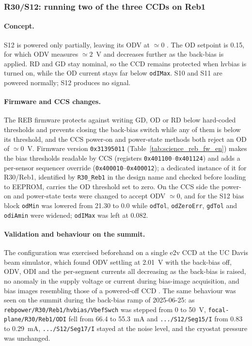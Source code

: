 \subsubsection{R30/S12: running two of the three CCDs on Reb1}
\label{sec:r30s12-solution}

\paragraph{Concept.}
S12 is powered only partially, leaving its ODV at $\simeq0$
\citep{marshall:ntp}. The OD setpoint is 0.15, for which ODV measures
$\simeq2$~V and decreases further as the back-bias is applied. RD and GD stay
nominal, so the CCD remains protected when hvbias is turned on, while the OD
current stays far below \texttt{odIMax}. S10 and S11 are powered normally;
S12 produces no signal.

\paragraph{Firmware and CCS changes.}
The REB firmware protects against writing GD, OD or RD below hard-coded
thresholds and prevents closing the back-bias switch while any of them is
below its threshold, and the CCS power-on and power-state methods both reject
an OD of $\simeq0$~V. Firmware version \texttt{0x31395011}
(Table~\ref{tab:science_reb_fw_en}) makes the bias thresholds readable by CCS
(registers \texttt{0x401100}--\texttt{0x401124}) and adds a per-sensor
sequencer override (\texttt{0x400010}--\texttt{0x400012}); a dedicated
instance of it for R30/Reb1, identified by \texttt{R30\_Reb1} in the design
name and checked before loading to EEPROM, carries the OD threshold set to
zero. On the CCS side the power-on and power-state tests were changed to
accept ODV $\simeq0$, and for the S12 bias block \texttt{odMin} was lowered
from 21.30 to 0.0 while \texttt{odTol}, \texttt{odZeroErr}, \texttt{gdTol} and
\texttt{odiAmin} were widened; \texttt{odIMax} was left at 0.082.

\paragraph{Validation and behaviour on the summit.}
The configuration was exercised beforehand on a single e2v CCD at the UC Davis
beam simulator, which found ODV settling at 2.01~V with the back-bias off,
ODV, ODI and the per-segment currents all decreasing as the back-bias is
raised, no anomaly in the supply voltage or current during bias-image
acquisition, and bias images resembling those of a powered-off CCD
\citep{ucd:vodzero}. The same behaviour was seen on the summit during the
back-bias ramp of 2025-06-25: as
\texttt{rebpower/R30/Reb1/hvbias/VbefSwch} was stepped from 0 to 50~V,
\texttt{focal-plane/R30/Reb1/ODI} fell from 66.4 to 55.3~mA and
\texttt{.../S12/Seg15/I} from 0.83 to 0.29~mA, \texttt{.../S12/Seg17/I} stayed
at the noise level, and the cryostat pressure was unchanged.

